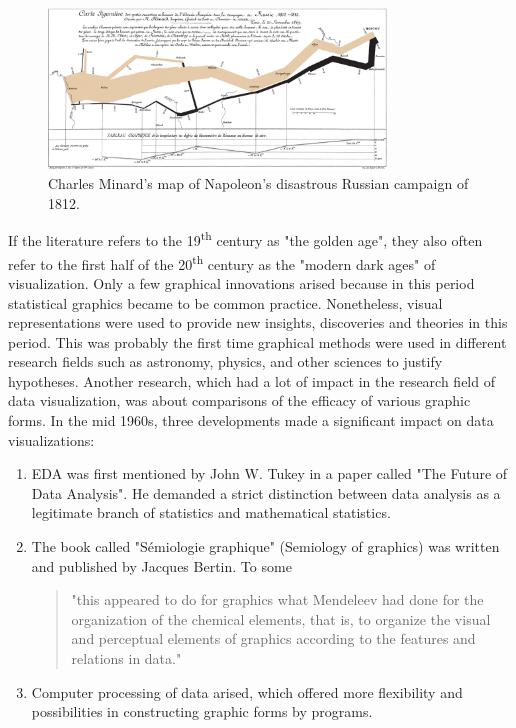 \begin{figure}[!htb]
\centering
\includegraphics[width=0.8\textwidth,keepaspectratio]{images/history/minard2.png}
\caption[
    Charles Minard's map of Napoleon's disastrous Russian campaign of 1812., Urldate: 07.2016 \newline
\small\texttt{\url{https://upload.wikimedia.org/wikipedia/commons/2/29/Minard.png}}
]{Charles Minard's map of Napoleon's disastrous Russian campaign of 1812.}
\label{fig:minard2}
\end{figure}

If the literature refers to the 19\textsuperscript{th} century as "the golden age", they also often refer to the first half of the 20\textsuperscript{th} century as the "modern dark ages" of visualization. Only a few graphical innovations arised because in this period statistical graphics became to be common practice. Nonetheless, visual representations were used to provide new insights, discoveries and theories in this period. This was probably the first time graphical methods were used in different research fields such as astronomy, physics, and other sciences to justify hypotheses. Another research, which had a lot of impact in the research field of data visualization, was about comparisons of the efficacy of various graphic forms. In the mid 1960s, three developments made a significant impact on data visualizations:
\begin{enumerate}
\item \ac{EDA} was first mentioned by John W. Tukey in a paper called "The Future of Data Analysis". He demanded a strict distinction between data analysis as a legitimate branch of statistics and mathematical statistics.
\item The book called "Sémiologie graphique" (Semiology of graphics) was written and published by Jacques Bertin. To some
\begin{quote}
"this appeared to do for graphics what Mendeleev had done for the organization of the chemical elements, that is, to organize the visual and perceptual elements of graphics according to the features and relations in data."
\end{quote}
\item Computer processing of data arised, which offered more flexibility and possibilities in constructing graphic forms by programs.
\end{enumerate}

